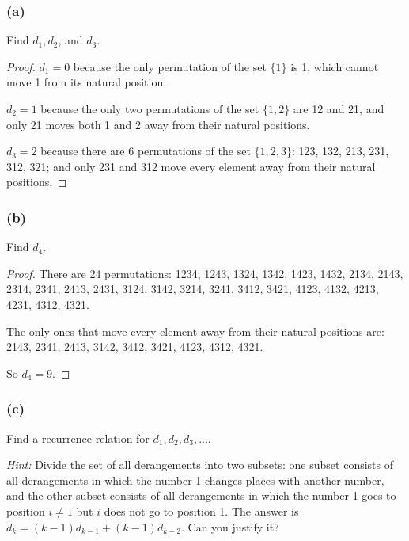 \documentclass[14pt]{extarticle}
\begin{document}
\subsubsection{(a)}
Find \(d_1, d_2\), and \(d_3\).

\begin{proof}
\(d_1 = 0\) because the only permutation of the set \(\{1\}\) is 1, which cannot move 1 from its natural position.

\(d_2 = 1\) because the only two permutations of the set \(\{1,2\}\) are 12 and 21, and only 21 moves both 1 and 2 
away from their natural positions.

\(d_3 = 2\) because there are 6 permutations of the set \(\{1,2,3\}\): 123, 132, 213, 231, 312, 321; and only 231 
and 312 move every element away from their natural positions.
\end{proof}

\subsubsection{(b)}
Find \(d_4\).

\begin{proof}
There are 24 permutations: 1234, 1243, 1324, 1342, 1423, 1432, 2134, 2143, 2314, 2341, 2413, 2431, 3124, 3142, 3214, 
3241, 3412, 3421, 4123, 4132, 4213, 4231, 4312, 4321.

The only ones that move every element away from their natural positions are: 2143, 2341, 2413, 3142, 3412, 3421, 
4123, 4312, 4321.

So \(d_4 = 9\).
\end{proof}

\subsubsection{(c)}
Find a recurrence relation for \(d_1, d_2, d_3, \ldots\).

{\it Hint:} Divide the set of all derangements into two subsets: one subset consists of all derangements in which 
the number 1 changes places with another number, and the other subset consists of all derangements in which the 
number 1 goes to position \(i \neq 1\) but $i$ does not go to position 1. The answer is \(d_k = (k - 1)d_{k-1} + (k-1)
d_{k-2}\). Can you justify it?
\end{document}

